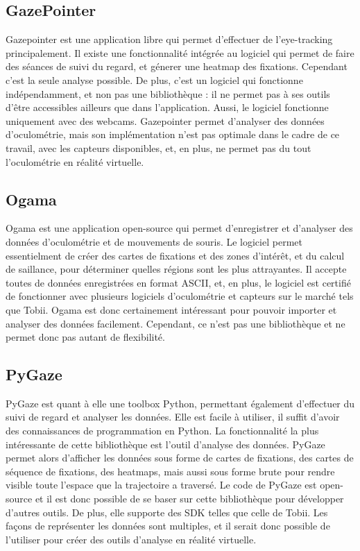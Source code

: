 \documentclass[12pt]{article}
\begin{document}
\subsection{GazePointer}

Gazepointer \cite{gazepointer} est une application libre qui permet d'effectuer
de l'eye-tracking principalement. Il existe une fonctionnalité intégrée au
logiciel qui permet de faire des séances de suivi du regard, et génerer une
heatmap des fixations. Cependant c'est la seule analyse possible. De plus,
c'est un logiciel qui fonctionne indépendamment, et non pas une bibliothèque :
il ne permet pas à ses outils d'être accessibles ailleurs que dans
l'application. Aussi, le logiciel fonctionne uniquement avec des webcams.
Gazepointer permet d'analyser des données d'oculométrie, mais son
implémentation n'est pas optimale dans le cadre de ce travail, avec les
capteurs disponibles, et, en plus, ne permet pas du tout l'oculométrie en
réalité virtuelle.

\subsection{Ogama}

Ogama \cite{ogama} est une application open-source qui permet d'enregistrer et
d'analyser des données d'oculométrie et de mouvements de souris. Le logiciel
permet essentielment de créer des cartes de fixations et des zones d'intérêt,
et du calcul de saillance, pour déterminer quelles régions sont les plus
attrayantes. Il accepte toutes de données enregistrées en format ASCII, et, en
plus, le logiciel est certifié de fonctionner avec plusieurs logiciels
d'oculométrie et capteurs sur le marché tels que Tobii. Ogama est donc
certainement intéressant pour pouvoir importer et analyser des données
facilement. Cependant, ce n'est pas une bibliothèque et ne permet donc pas
autant de flexibilité.

\subsection{PyGaze}

PyGaze \cite{pygaze} est quant à elle une toolbox Python, permettant également
d'effectuer du suivi de regard et analyser les données. Elle est facile à
utiliser, il suffit d'avoir des connaissances de programmation en Python.
La fonctionnalité la plus intéressante de cette bibliothèque est l'outil
d'analyse des données. PyGaze permet alors d'afficher les données sous
forme de cartes de fixations, des cartes de séquence de fixations, des heatmaps,
mais aussi sous forme brute pour rendre visible toute l'espace que la
trajectoire a traversé. Le code de PyGaze est open-source et il est donc
possible de se baser sur cette bibliothèque pour développer d'autres outils. De
plus, elle supporte des SDK telles que celle de Tobii. Les façons de
représenter les données sont multiples, et il serait donc possible de
l'utiliser pour créer des outils d'analyse en réalité virtuelle.
\end{document}
